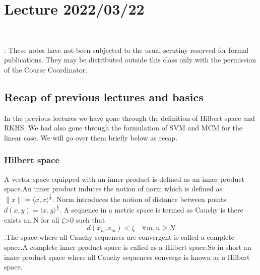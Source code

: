 \documentclass[../main.tex]{subfiles}
\newcommand{\counter}{0}
\begin{document}
\chapter{Lecture 2022/03/22} 

		\begin{center}
			\ \\
		\end{center}
		
		: {These notes have not been subjected to the
			usual scrutiny reserved for formal publications.  They may be distributed
			outside this class only with the permission of the Course Coordinator.}
		\vspace*{4mm}
		\setcounter{section}{\counter}

\newpage

\section{Recap of previous lectures and basics}
In the previous lectures we have gone through the definition of Hilbert space and RKHS. We had also gone through the formulation of SVM and MCM for the linear case. We will go over them briefly below as recap.
    \subsection{Hilbert space}
    A vector space equipped with an inner product is defined as an inner product space.An inner product induces the notion of norm which is defined as $\|x\|=\langle x, x\rangle^{\frac{1}{2}}$. Norm introduces the notion of distance between points $ d(x,y)=\langle x, y\rangle^{\frac{1}{2}}$.
    \newline
    A sequence in a metric space is termed as Cauchy is there exists an N for all $\zeta$>0 such that $$d\left(x_{n}, x_{m}\right)<\zeta \quad \forall m, n \geq N$$.The space where all Cauchy sequences are convergent is called a complete space.A complete inner product space is called as a Hilbert space.So in short an inner product space where all Cauchy sequences converge is known as a Hilbert space.
\end{document}
